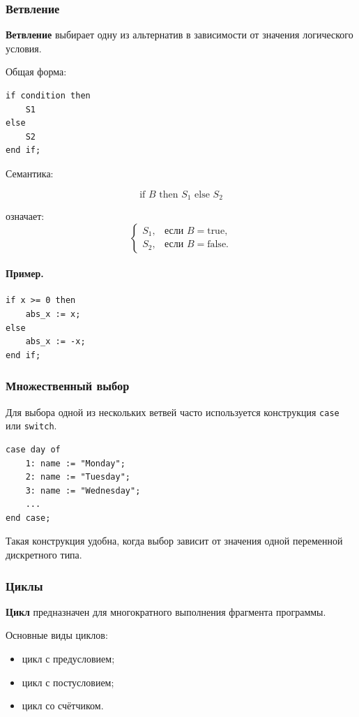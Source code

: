 \documentclass[12pt,a4paper]{article}
\begin{document}
\subsubsection{Ветвление}

\textbf{Ветвление} выбирает одну из альтернатив в зависимости от значения логического условия.

Общая форма:

\begin{verbatim}
if condition then
    S1
else
    S2
end if;
\end{verbatim}

Семантика:

\[
\text{if } B \text{ then } S_1 \text{ else } S_2
\]

означает:
\[
\begin{cases}
S_1, & \text{если } B = \text{true},\\
S_2, & \text{если } B = \text{false}.
\end{cases}
\]

\paragraph{Пример.}

\begin{verbatim}
if x >= 0 then
    abs_x := x;
else
    abs_x := -x;
end if;
\end{verbatim}

\subsubsection{Множественный выбор}

Для выбора одной из нескольких ветвей часто используется конструкция \texttt{case} или \texttt{switch}.

\begin{verbatim}
case day of
    1: name := "Monday";
    2: name := "Tuesday";
    3: name := "Wednesday";
    ...
end case;
\end{verbatim}

Такая конструкция удобна, когда выбор зависит от значения одной переменной дискретного типа.

\subsubsection{Циклы}

\textbf{Цикл} предназначен для многократного выполнения фрагмента программы.

Основные виды циклов:
\begin{itemize}
    \item цикл с предусловием;
    \item цикл с постусловием;
    \item цикл со счётчиком.
\end{itemize}
\end{document}
